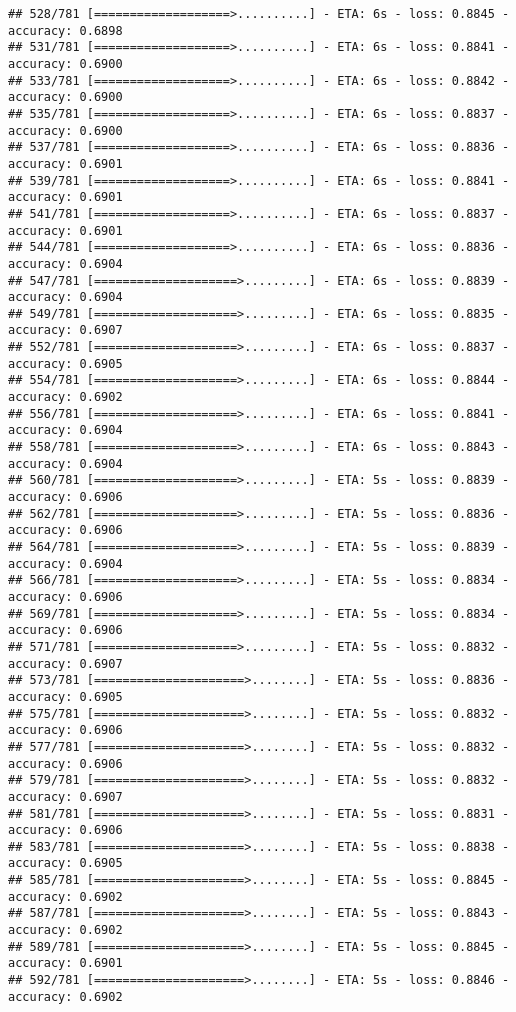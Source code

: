 \documentclass[
]{article}
\begin{document}
\begin{verbatim}
## 528/781 [===================>..........] - ETA: 6s - loss: 0.8845 - accuracy: 0.6898
## 531/781 [===================>..........] - ETA: 6s - loss: 0.8841 - accuracy: 0.6900
## 533/781 [===================>..........] - ETA: 6s - loss: 0.8842 - accuracy: 0.6900
## 535/781 [===================>..........] - ETA: 6s - loss: 0.8837 - accuracy: 0.6900
## 537/781 [===================>..........] - ETA: 6s - loss: 0.8836 - accuracy: 0.6901
## 539/781 [===================>..........] - ETA: 6s - loss: 0.8841 - accuracy: 0.6901
## 541/781 [===================>..........] - ETA: 6s - loss: 0.8837 - accuracy: 0.6901
## 544/781 [===================>..........] - ETA: 6s - loss: 0.8836 - accuracy: 0.6904
## 547/781 [====================>.........] - ETA: 6s - loss: 0.8839 - accuracy: 0.6904
## 549/781 [====================>.........] - ETA: 6s - loss: 0.8835 - accuracy: 0.6907
## 552/781 [====================>.........] - ETA: 6s - loss: 0.8837 - accuracy: 0.6905
## 554/781 [====================>.........] - ETA: 6s - loss: 0.8844 - accuracy: 0.6902
## 556/781 [====================>.........] - ETA: 6s - loss: 0.8841 - accuracy: 0.6904
## 558/781 [====================>.........] - ETA: 6s - loss: 0.8843 - accuracy: 0.6904
## 560/781 [====================>.........] - ETA: 5s - loss: 0.8839 - accuracy: 0.6906
## 562/781 [====================>.........] - ETA: 5s - loss: 0.8836 - accuracy: 0.6906
## 564/781 [====================>.........] - ETA: 5s - loss: 0.8839 - accuracy: 0.6904
## 566/781 [====================>.........] - ETA: 5s - loss: 0.8834 - accuracy: 0.6906
## 569/781 [====================>.........] - ETA: 5s - loss: 0.8834 - accuracy: 0.6906
## 571/781 [====================>.........] - ETA: 5s - loss: 0.8832 - accuracy: 0.6907
## 573/781 [=====================>........] - ETA: 5s - loss: 0.8836 - accuracy: 0.6905
## 575/781 [=====================>........] - ETA: 5s - loss: 0.8832 - accuracy: 0.6906
## 577/781 [=====================>........] - ETA: 5s - loss: 0.8832 - accuracy: 0.6906
## 579/781 [=====================>........] - ETA: 5s - loss: 0.8832 - accuracy: 0.6907
## 581/781 [=====================>........] - ETA: 5s - loss: 0.8831 - accuracy: 0.6906
## 583/781 [=====================>........] - ETA: 5s - loss: 0.8838 - accuracy: 0.6905
## 585/781 [=====================>........] - ETA: 5s - loss: 0.8845 - accuracy: 0.6902
## 587/781 [=====================>........] - ETA: 5s - loss: 0.8843 - accuracy: 0.6902
## 589/781 [=====================>........] - ETA: 5s - loss: 0.8845 - accuracy: 0.6901
## 592/781 [=====================>........] - ETA: 5s - loss: 0.8846 - accuracy: 0.6902

\end{verbatim}
\end{document}
